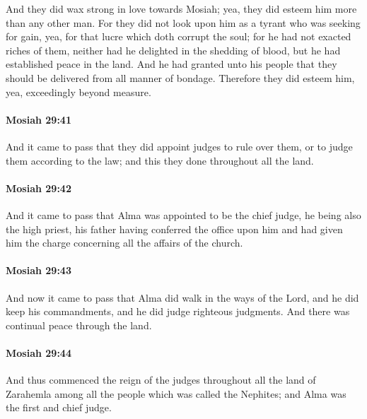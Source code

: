 			And they did wax strong in love towards Mosiah;
			yea, they did esteem him more than any other man.
			For they did not look upon him as a tyrant who was seeking for gain,
			yea, for that lucre which doth corrupt the soul;
			for he had not exacted riches of them,
			neither had he delighted in the shedding of blood,
			but he had established peace in the land.
			And he had granted unto his people
			that they should be delivered from all manner of bondage.
			Therefore they did esteem him,
			yea, exceedingly beyond measure.

		\paragraph{Mosiah 29:41} %
			\label{MOSIAH-29-41}

			And it came to pass that they did appoint judges to rule over them,
			or to judge them according to the law;
			and this they done throughout all the land.

		\paragraph{Mosiah 29:42} %
			\label{MOSIAH-29-42}

			And it came to pass that Alma was appointed to be the chief judge,
			he being also the high priest,
			his father having conferred the office upon him
			and had given him the charge concerning all the affairs of the church.

		\paragraph{Mosiah 29:43} %
			\label{MOSIAH-29-43}

			And now it came to pass that Alma did walk in the ways of the Lord,
			and he did keep his commandments,
			and he did judge righteous judgments.
			And there was continual peace through the land.

		\paragraph{Mosiah 29:44} %
			\label{MOSIAH-29-44}

			And thus commenced the reign of the judges throughout all the land of Zarahemla
			among all the people which was called the Nephites;
			and Alma was the first and chief judge.

